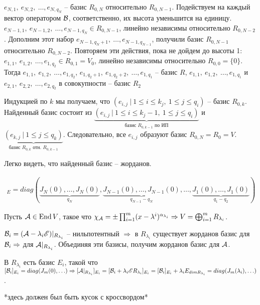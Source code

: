 \documentclass[main]{subfiles}
\begin{document}
$e_{N, 1}, \ e_{N, 2}, \ \ldots, e_{N, q_N}$ -- базис $R_{0, N}$ относительно $R_{0, N-1}$.
Подействуем на каждый вектор оператором $\mathcal{B}$, соответственно, их высота уменьшится на единицу.
$e_{N-1, 1}, \ e_{N-1, 2}, \ \ldots, e_{N-1, q_N} \in R_{0, N-1}$, линейно независимы относительно $ R_{0, N-2}$.
Дополним этот набор $e_{N-1, q_N+1}, \ \ldots, e_{N-1, q_{N-1}}$, получили базис  $R_{0, N-1}$ относительно $R_{0, N-2}$. Повторяем эти действия, пока не дойдем до высоты 1:
$e_{1, 1}, \ e_{1, 2}, \ \ldots, e_{1, q_2} \in R_{0, 1} = V_0$, линейно независимы относительно $ R_{0, 0} = \{0\}$.
Тогда $e_{1, 1}, \ e_{1, 2}, \ \ldots, e_{1, q_2}$, $e_{1, q_2+1}, \ e_{1, q_2+2}, \ \ldots, e_{1, q_1}$ -- базис $R$,
$e_{1, 1}, \ e_{1, 2}, \ \ldots, e_{1, q_1}$ и $e_{2, 1}, \ e_{2, 2}, \ \ldots, e_{2, q_2}$ в совокупности -- базис $R_2$

Индукцией по $k$ мы получаем, что $(e_{i,j} \  | \ 1 \leq i \leq k_j, \ 1 \leq j \leq q_i)$ -- базис $R_{0, k}$.
Найденный базис состоит из $\underbrace{(e_{i,j} \  | \ 1 \leq i \leq k_j-1, \ 1 \leq j \leq q_i)}_{\textrm{базис $R_{0, k-1}$ по ИП}}$
и $\underbrace{(e_{k,j} \  | \ 1 \leq j \leq q_k)}_{\textrm{базис $R_{0, k}$ отн. $R_{0, k-1}$}}$. Следовательно, все $e_{i,j}$ образуют базис
$R_{0, N} = R_0 = V$.

Легко видеть, что найденный базис -- жорданов.

\begin{gather*}
  [\mcb]_E = diag(\underbrace{J_N(0), \ldots, J_N(0)}_{q_N}, \underbrace{J_{N-1}(0), \ldots, J_{N-1}(0)}_{q_{N-1}-q_N}, \ldots, \underbrace{J_1(0), \ldots, J_1(0)}_{q_1-q_2})
\end{gather*}

Пусть $\mathcal{A} \in \operatorname{End} V$, такое что  $\chi_{\mathcal{A}} = \pm \prod_{i=1}^m (x-\lambda^i)^{\alpha_{\lambda_i}} \Rightarrow
  V = \bigoplus_{i=1}^m R_{\lambda_i}$.

$\mathcal{B}_i = (\mathcal{A} - \lambda_i\mathscr{E}) |_{R_{\lambda_i}}$ -- нильпотентный $\Rightarrow$ в $R_{\lambda_i}$ существует жорданов базис для $\mathcal{B}_i \Rightarrow$ для $\mathcal{A}|_{R_{\lambda_i}}$.
Объединяя эти базисы, получим жорданов базис для $\mathcal{A}$.

В $R_{\lambda_i}$ есть базис $E_i$, такой что $[\mathcal{B}_i]_{E_i} = diag(J_m(0), \ldots) \Rightarrow
  [\mathcal{A}|_{R_{\lambda_i}}]_{E_i} = [\mathcal{B}_i+\lambda_i \mathscr{E}{R_{\lambda_i}}]_{E_i} =
    [\mathcal{B}_i]_{E_i}+ \lambda_i E_{dim R_{\lambda_i}} = diag(J_m(\lambda_i), \ldots)$.

*здесь должен был быть кусок с кроссвордом*
\end{document}
